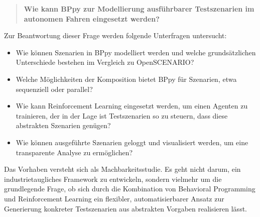 \begin{quote}
\textbf{Wie kann BPpy zur Modellierung ausführbarer Testszenarien im autonomen Fahren eingesetzt werden?}
\end{quote}

Zur Beantwortung dieser Frage werden folgende Unterfragen untersucht:
\begin{itemize}
    \item Wie können Szenarien in BPpy modelliert werden und welche grundsätzlichen Unterschiede bestehen im Vergleich zu OpenSCENARIO?
    \item Welche Möglichkeiten der Komposition bietet BPpy für Szenarien, etwa sequenziell oder parallel?
    \item Wie kann Reinforcement Learning eingesetzt werden, um einen Agenten zu trainieren, der in der Lage ist Testszenarien so zu steuern, dass diese abstrakten Szenarien genügen?
    \item Wie können ausgeführte Szenarien geloggt und visualisiert werden, um eine transparente Analyse zu ermöglichen?
\end{itemize}

Das Vorhaben versteht sich als Machbarkeitsstudie. Es geht nicht darum, ein industrietaugliches Framework zu entwickeln, sondern vielmehr um die grundlegende Frage, ob sich durch die Kombination von Behavioral Programming und Reinforcement Learning ein flexibler, automatisierbarer Ansatz zur Generierung konkreter Testszenarien aus abstrakten Vorgaben realisieren lässt.